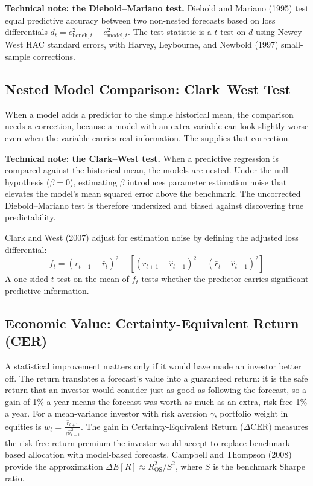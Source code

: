 \begin{technote}
\textbf{Technical note: the Diebold--Mariano test.} Diebold and Mariano (1995) test equal predictive accuracy between two non-nested forecasts based on loss differentials $d_t = e^2_{\text{bench},t} - e^2_{\text{model},t}$. The test statistic is a $t$-test on $\bar{d}$ using Newey--West HAC standard errors, with Harvey, Leybourne, and Newbold (1997) small-sample corrections.
\end{technote}

\subsection{Nested Model Comparison: Clark--West Test}
When a model adds a predictor to the simple historical mean, the comparison needs a correction, because a model with an extra variable can look slightly worse even when the variable carries real information. The  supplies that correction.

\begin{technote}
\textbf{Technical note: the Clark--West test.} When a predictive regression is compared against the historical mean, the models are nested. Under the null hypothesis ($\beta=0$), estimating $\beta$ introduces parameter estimation noise that elevates the model's mean squared error above the benchmark. The uncorrected Diebold--Mariano test is therefore undersized and biased against discovering true predictability.

Clark and West (2007) adjust for estimation noise by defining the adjusted loss differential:
\begin{equation}
  f_t = (r_{t+1} - \bar r_t)^2 - \left[(r_{t+1} - \hat r_{t+1})^2 - (\bar r_t - \hat r_{t+1})^2\right]
  \label{eq:09-cw}
\end{equation}
A one-sided $t$-test on the mean of $f_t$ tests whether the predictor carries significant predictive information.
\end{technote}

\subsection{Economic Value: Certainty-Equivalent Return (CER)}
A statistical improvement matters only if it would have made an investor better off. The \label{kt:certainty-equivalent} return translates a forecast's value into a guaranteed return: it is the safe return that an investor would consider just as good as following the forecast, so a gain of 1\% a year means the forecast was worth as much as an extra, risk-free 1\% a year. For a mean-variance investor with risk aversion $\gamma$, portfolio weight in equities is $w_t = \frac{\hat{r}_{t+1}}{\gamma \hat{\sigma}^2_{t+1}}$. The gain in Certainty-Equivalent Return ($\Delta \text{CER}$) measures the risk-free return premium the investor would accept to replace benchmark-based allocation with model-based forecasts. Campbell and Thompson (2008) provide the approximation $\Delta E[R] \approx R^2_{\text{OS}} / S^2$, where $S$ is the benchmark Sharpe ratio.

